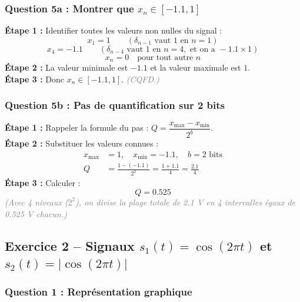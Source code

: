 \documentclass[12pt,a4paper]{article}
\newcommand{\step}[1]{\textcolor{coursbleu}{\textbf{Étape #1 :}}}
\newcommand{\explication}[1]{\textit{\textcolor{gray}{(#1)}}}
\newcommand{\encadre}[1]{\boxed{#1}}
\begin{document}
\subsubsection*{Question 5a : Montrer que $x_n \in [-1.1, 1]$}

\begin{tcolorbox}[corrbox, title=Correction Q5a]
\step{1} Identifier toutes les valeurs non nulles du signal :
\[
  x_1 = 1 \qquad (\delta_{n-1}\text{ vaut 1 en }n=1)
\]
\[
  x_4 = -1.1 \qquad (\delta_{n-4}\text{ vaut 1 en }n=4, \text{ et on a }-1.1\times 1)
\]
\[
  x_n = 0 \quad \text{pour tout autre } n
\]
\step{2} La valeur minimale est $-1.1$ et la valeur maximale est $1$.\\[3pt]
\step{3} Donc $x_n \in [-1.1, 1]$. \quad \explication{CQFD.}
\end{tcolorbox}

\subsubsection*{Question 5b : Pas de quantification sur 2 bits}

\begin{tcolorbox}[corrbox, title=Correction Q5b]
\step{1} Rappeler la formule du pas : $Q = \dfrac{x_{\max} - x_{\min}}{2^b}$.\\[6pt]
\step{2} Substituer les valeurs connues :
\begin{align*}
  x_{\max} &= 1, \quad x_{\min} = -1.1, \quad b = 2 \text{ bits}\\[4pt]
  Q &= \frac{1 - (-1.1)}{2^2} = \frac{1 + 1.1}{4} = \frac{2.1}{4}
\end{align*}
\step{3} Calculer :
\[
  \encadre{Q = 0.525}
\]
\explication{Avec 4 niveaux ($2^2$), on divise la plage totale de 2.1 V en 4 intervalles
égaux de 0.525 V chacun.}
\end{tcolorbox}

\subsection{Exercice 2 -- Signaux
  \texorpdfstring{$s_1(t) = \cos(2\pi t)$ et $s_2(t) = |\cos(2\pi t)|$}%
  {s1(t) = cos(2 pi t) et s2(t) = |cos(2 pi t)|}}

\subsubsection*{Question 1 : Représentation graphique}
\end{document}
